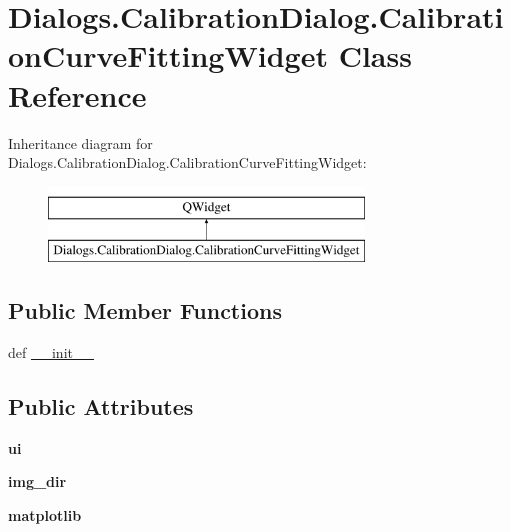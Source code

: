 \hypertarget{classDialogs_1_1CalibrationDialog_1_1CalibrationCurveFittingWidget}{\section{Dialogs.\-Calibration\-Dialog.\-Calibration\-Curve\-Fitting\-Widget Class Reference}
\label{classDialogs_1_1CalibrationDialog_1_1CalibrationCurveFittingWidget}
}
Inheritance diagram for Dialogs.\-Calibration\-Dialog.\-Calibration\-Curve\-Fitting\-Widget\-:\begin{figure}[H]
\begin{center}
\leavevmode
\includegraphics[height=2.000000cm]{classDialogs_1_1CalibrationDialog_1_1CalibrationCurveFittingWidget}
\end{center}
\end{figure}
\subsection*{Public Member Functions}
\begin{DoxyCompactItemize}
\item 
def \hyperlink{classDialogs_1_1CalibrationDialog_1_1CalibrationCurveFittingWidget_a35b7481066c5991eca76355975dcee85}{\-\_\-\-\_\-init\-\_\-\-\_\-}
\end{DoxyCompactItemize}
\subsection*{Public Attributes}
\begin{DoxyCompactItemize}
\item 
\hypertarget{classDialogs_1_1CalibrationDialog_1_1CalibrationCurveFittingWidget_a5ed7176f8414595efff19c74a552d5e0}{{\bfseries ui}}\label{classDialogs_1_1CalibrationDialog_1_1CalibrationCurveFittingWidget_a5ed7176f8414595efff19c74a552d5e0}

\item 
\hypertarget{classDialogs_1_1CalibrationDialog_1_1CalibrationCurveFittingWidget_a959f959cf28e9c23e84df700326bf516}{{\bfseries img\-\_\-dir}}\label{classDialogs_1_1CalibrationDialog_1_1CalibrationCurveFittingWidget_a959f959cf28e9c23e84df700326bf516}

\item 
\hypertarget{classDialogs_1_1CalibrationDialog_1_1CalibrationCurveFittingWidget_ab03709c7667d4a969e9d2cb16f724e33}{{\bfseries matplotlib}}\label{classDialogs_1_1CalibrationDialog_1_1CalibrationCurveFittingWidget_ab03709c7667d4a969e9d2cb16f724e33}

\end{DoxyCompactItemize}


